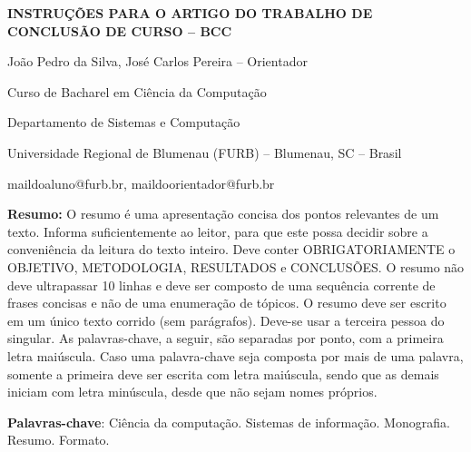 \documentclass[10pt,oneside,a4paper]{article}
\begin{document}
\begin{center}
{\textbf{INSTRUÇÕES PARA O ARTIGO DO TRABALHO DE CONCLUSÃO DE CURSO -- BCC}\par}

\vspace{0.4cm}
{João Pedro da Silva, José Carlos Pereira -- Orientador\par}

\vspace{6pt}
{\setlength{\parskip}{0pt}%
Curso de Bacharel em Ciência da Computação\par
Departamento de Sistemas e Computação\par
Universidade Regional de Blumenau (FURB) -- Blumenau, SC -- Brasil\par}

\vspace{6pt}
maildoaluno@furb.br, maildoorientador@furb.br
\end{center}

\noindent\textbf{Resumo:} O resumo é uma apresentação concisa dos pontos relevantes de
um texto. Informa suficientemente ao leitor, para que este possa decidir
sobre a conveniência da leitura do texto inteiro. Deve conter
OBRIGATORIAMENTE o OBJETIVO, METODOLOGIA, RESULTADOS e CONCLUSÕES. O
resumo não deve ultrapassar 10 linhas e deve ser composto de uma
sequência corrente de frases concisas e não de uma enumeração de
tópicos. O resumo deve ser escrito em um único texto corrido (sem
parágrafos). Deve-se usar a terceira pessoa do singular. As
palavras-chave, a seguir, são separadas por ponto, com a primeira letra
maiúscula. Caso uma palavra-chave seja composta por mais de uma palavra,
somente a primeira deve ser escrita com letra maiúscula, sendo que as
demais iniciam com letra minúscula, desde que não sejam nomes próprios.

\noindent\textbf{Palavras-chave}: Ciência da computação. Sistemas de informação.
Monografia. Resumo. Formato.








\appendix
\renewcommand{\thesection}{Apêndice \Alph{section}}


\end{document}
